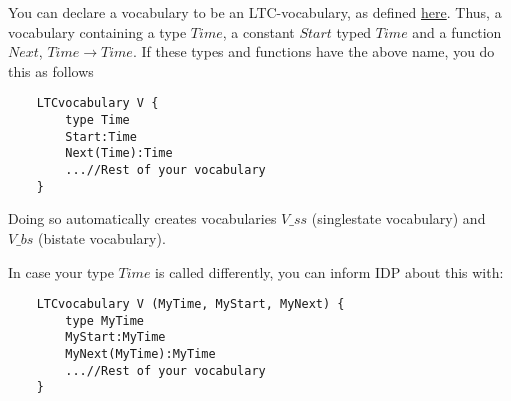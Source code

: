 You can declare a vocabulary to be an LTC-vocabulary, as defined \href{http://dtai.cs.kuleuven.be/krr/files/progression.pdf}{here}. Thus, a vocabulary containing a type $Time$, a constant $Start$ typed $Time$ and a function $Next$, $Time\to Time$. 
If these types and functions have the above name, you do this as follows
\begin{lstlisting}
	LTCvocabulary V {
		type Time	
		Start:Time
		Next(Time):Time
		...//Rest of your vocabulary
	}
\end{lstlisting} 

Doing so automatically creates  vocabularies $V\_ss$ (singlestate vocabulary) and $V\_bs$ (bistate vocabulary). 

In case your type $Time$ is called differently, you can inform IDP about this with:

\begin{lstlisting}
	LTCvocabulary V (MyTime, MyStart, MyNext) {
		type MyTime	
		MyStart:MyTime
		MyNext(MyTime):MyTime
		...//Rest of your vocabulary
	}
\end{lstlisting} 






